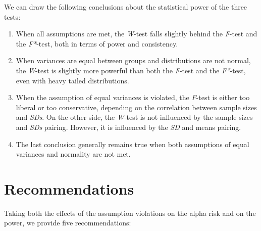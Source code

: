 \documentclass[man,floatsintext]{apa6}
\providecommand{\tightlist}{%
  \setlength{\itemsep}{0pt}\setlength{\parskip}{0pt}}
\begin{document}
We can draw the following conclusions about the statistical power of the three tests:

\begin{enumerate}
\def\labelenumi{\arabic{enumi})}
\tightlist
\item
  When all assumptions are met, the \emph{W}-test falls slightly behind the \emph{F}-test and the \emph{F*}-test, both in terms of power and consistency.
\item
  When variances are equal between groups and distributions are not normal, the \emph{W}-test is slightly more powerful than both the \emph{F}-test and the \emph{F*}-test, even with heavy tailed distributions.
\item
  When the assumption of equal variances is violated, the \emph{F}-test is either too liberal or too conservative, depending on the correlation between sample sizes and \emph{SDs}. On the other side, the \emph{W}-test is not influenced by the sample sizes and \emph{SDs} pairing. However, it is influenced by the \emph{SD} and means pairing.
\item
  The last conclusion generally remains true when both assumptions of equal variances and normality are not met.
\end{enumerate}

\hypertarget{recommendations}{%
\section{Recommendations}\label{recommendations}}

Taking both the effects of the assumption violations on the alpha risk and on the power, we provide five recommendations:
\end{document}
